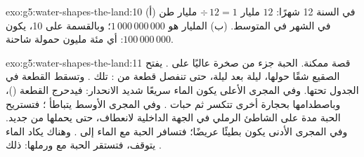 \begin{solution}{exo:g5:water-shapes-the-land:10}
(أ) في السنة 12 شهرًا: $12$ مليار $\div\, 12 = 1$ مليار طن في الشهر
في المتوسط. (ب) المليار هو $1\,000\,000\,000$؛ وبالقسمة على 10، يكون
$100\,000\,000$: أي مئة مليون حمولة شاحنة.
\end{solution}

\begin{solution}{exo:g5:water-shapes-the-land:11}
قصة ممكنة. الحبة جزء من صخرة عاليًا على . يفتح الصقيع
شقًا حولها، ليلة بعد ليلة، حتى تنفصل قطعة من
: تلك . وتسقط القطعة في الجدول تحتها. وفي المجرى
الأعلى يكون الماء سريعًا شديد الانحدار: فيدحرج القطعة ()، وباصطدامها
بحجارة أخرى تتكسر  ثم حبات
. وفي المجرى الأوسط يتباطأ ؛ فتستريح الحبة مدة على
الشاطئ الرملي في الجهة الداخلية لانعطاف، حتى يحملها  من جديد. وفي
المجرى الأدنى يكون  بطيئًا عريضًا؛ فتسافر الحبة مع
الماء إلى . وهناك يكاد الماء يتوقف، فتستقر الحبة
مع   ورملها: ذلك .
\end{solution}
